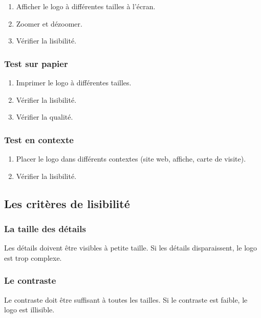 \begin{enumerate}
    \item Afficher le logo à différentes tailles à l'écran.
    \item Zoomer et dézoomer.
    \item Vérifier la lisibilité.
\end{enumerate}

\subsubsection{Test sur papier}

\begin{enumerate}
    \item Imprimer le logo à différentes tailles.
    \item Vérifier la lisibilité.
    \item Vérifier la qualité.
\end{enumerate}

\subsubsection{Test en contexte}

\begin{enumerate}
    \item Placer le logo dans différents contextes (site web, affiche, carte de visite).
    \item Vérifier la lisibilité.
\end{enumerate}

\subsection{Les critères de lisibilité}

\subsubsection{La taille des détails}

Les détails doivent être visibles à petite taille. Si les détails disparaissent, le logo est trop complexe.

\subsubsection{Le contraste}

Le contraste doit être suffisant à toutes les tailles. Si le contraste est faible, le logo est illisible.

